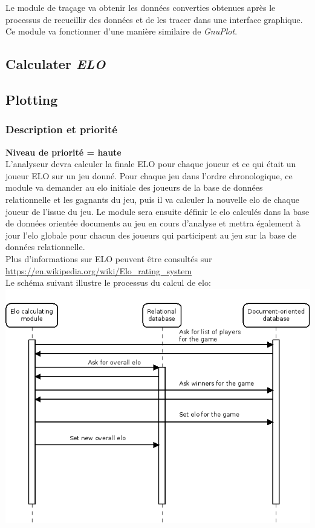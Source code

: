 \documentclass{scrreprt}
\begin{document}
Le module de traçage va obtenir les données converties obtenues après le processus de recueillir des données et de les tracer dans une interface graphique. Ce module va fonctionner d'une manière similaire de \textit{GnuPlot}.

\subsection{Calculater \textit{\textbf{ELO}}}
\subsection{Plotting}
\subsubsection{Description et priorité}
\textbf{Niveau de priorité = haute}\\

L'analyseur devra calculer la finale ELO pour chaque joueur et ce qui était un joueur ELO sur un jeu donné.
Pour chaque jeu dans l'ordre chronologique, ce module va demander au elo initiale des joueurs de la base de données relationnelle et les gagnants du jeu, puis il va calculer la nouvelle elo de chaque joueur de l'issue du jeu. Le module sera ensuite définir le elo calculés dans la base de données orientée documents au jeu en cours d'analyse et mettra également à jour l'elo globale pour chacun des joueurs qui participent au jeu sur la base de données relationnelle.\\

Plus d'informations sur ELO peuvent être consultés sur \url{https://en.wikipedia.org/wiki/Elo_rating_system}\\
Le schéma suivant illustre le processus du calcul de elo:\\
\includegraphics[width=\textwidth,height=\textheight,keepaspectratio]{diaRessources/elocalc}\\
\end{document}
